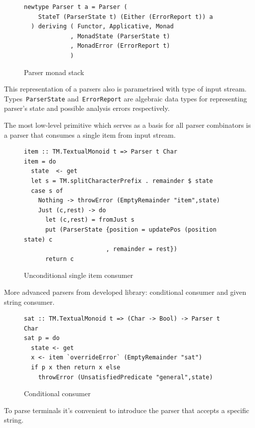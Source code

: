       \begin{figure}[h]
      \begin{lstlisting}
newtype Parser t a = Parser (
    StateT (ParserState t) (Either (ErrorReport t)) a
  ) deriving ( Functor, Applicative, Monad
             , MonadState (ParserState t)
             , MonadError (ErrorReport t)
             )
      \end{lstlisting}
      \caption{Parser monad stack}
      \label{listing:mtlParser}
      \end{figure}

      This representation of a parsers also is parametrised with type of input stream.
      Types~\texttt{ParserState} and~\texttt{ErrorReport} are algebraic
      data types for representing parser's state and possible analysis errors
      respectively.

      The most low-level primitive which serves as a basis for all parser combinators
      is a parser that consumes a single item from input stream.

      \begin{figure}[h]
      \begin{lstlisting}
item :: TM.TextualMonoid t => Parser t Char
item = do
  state  <- get
  let s = TM.splitCharacterPrefix . remainder $ state
  case s of
    Nothing -> throwError (EmptyRemainder "item",state)
    Just (c,rest) -> do
      let (c,rest) = fromJust s
      put (ParserState {position = updatePos (position state) c
                       , remainder = rest})
      return c
      \end{lstlisting}
      \caption{Unconditional single item consumer}
      \label{listing:mtlParserItem}
      \end{figure}

      More advanced parsers from developed library: conditional consumer and
      given string consumer.

      \begin{figure}[h]
      \begin{lstlisting}
sat :: TM.TextualMonoid t => (Char -> Bool) -> Parser t Char
sat p = do
  state <- get
  x <- item `overrideError` (EmptyRemainder "sat")
  if p x then return x else
    throwError (UnsatisfiedPredicate "general",state)
      \end{lstlisting}
      \caption{Conditional consumer}
      \label{listing:mtlParserSat}
      \end{figure}

      To parse terminals it's convenient to introduce the parser that accepts a
      specific string.

